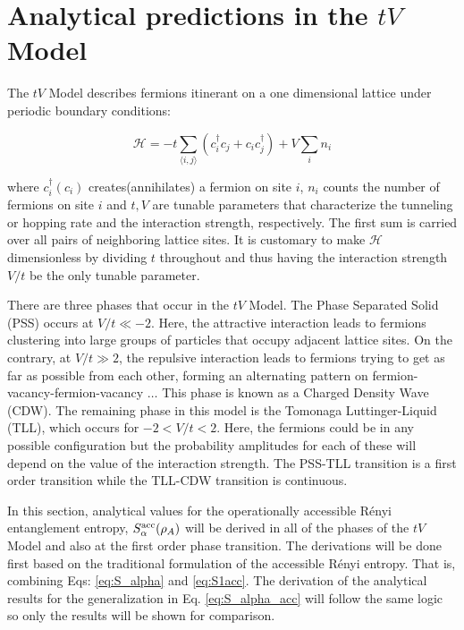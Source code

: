 \section{Analytical predictions in the $tV$ Model}

The $tV$ Model describes fermions itinerant on a one dimensional lattice under periodic boundary conditions:

\begin{equation}
\mathcal{H} = -t \sum_{\langle i,j \rangle} (c_{i}^{\dag}c_{j} + c_{i}c_{j}^{\dag}) + V \sum_{i} n_{i}
\label{eq:tVModel}
\end{equation}

where $c^{\dag}_i(c_{i})$ creates(annihilates) a fermion on site $i$, $n_i$ counts the number of fermions on site $i$ and $t,V$ are tunable parameters that characterize the tunneling or hopping rate and the interaction strength, respectively. The first sum is carried over all pairs of neighboring lattice sites. It is customary to make $\mathcal{H}$ dimensionless by dividing $t$ throughout and thus having the interaction strength $V/t$ be the only tunable parameter.

There are three phases that occur in the $tV$ Model. The Phase Separated Solid (PSS) occurs at $V/t \ll -2$. Here, the attractive interaction leads to fermions clustering into large groups of particles that occupy adjacent lattice sites. On the contrary, at $V/t \gg 2$, the repulsive interaction leads to fermions trying to get as far as possible from each other, forming an alternating pattern on fermion-vacancy-fermion-vacancy $\dots$ This phase is known as a Charged Density Wave (CDW). The remaining phase in this model is the Tomonaga Luttinger-Liquid (TLL), which occurs for $-2 < V/t < 2$. Here, the fermions could be in any possible configuration but the probability amplitudes for each of these will depend on the value of the interaction strength. The PSS-TLL transition is a first order transition while the TLL-CDW transition is continuous.

In this section, analytical values for the operationally accessible R\'enyi entanglement entropy, $S_{\alpha}^{\rm acc}(\rho_A)$ will be derived in all of the phases of the $tV$ Model and also at the first order phase transition. The derivations will be done first based on the traditional formulation of the accessible R\'enyi entropy. That is, combining Eqs: \ref{eq:S_alpha} and \ref{eq:S1acc}. The derivation of the analytical results for the generalization in Eq. \ref{eq:S_alpha_acc} will follow the same logic so only the results will be shown for comparison.

